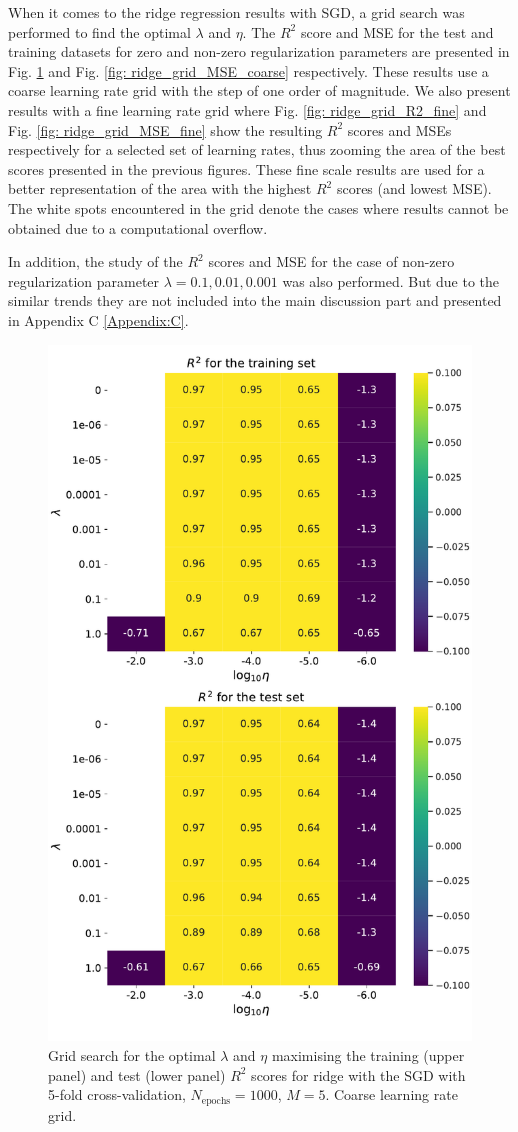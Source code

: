 \documentclass{emulateapj}
\begin{document}
When it comes to the ridge regression results with SGD, a grid search was performed to find the optimal $\lambda$ and $\eta$. The $R^{2}$ score and MSE for the test and training datasets  for zero and non-zero regularization parameters are presented in Fig. \ref{fig: ridge_grid_R2_coarse} and Fig. \ref{fig: ridge_grid_MSE_coarse} respectively. These results use a coarse learning rate grid with the step of one order of magnitude. We also present results with a fine learning rate grid where Fig. \ref{fig: ridge_grid_R2_fine} and Fig. \ref{fig: ridge_grid_MSE_fine} show the resulting $R^{2}$ scores and MSEs respectively for a selected set of learning rates, thus zooming the area of the best scores presented in the previous figures. These fine scale results are used for a better representation of the area with the highest $R^{2}$ scores (and lowest MSE). The white spots encountered in the grid denote the cases where results cannot be obtained due to a computational overflow.

In addition, the study of the $R^2$ scores and MSE for the case of non-zero regularization parameter $\lambda=0.1,0.01,0.001$ was also performed. But due to the similar trends they are not included into the main discussion part and presented in Appendix C \ref{Appendix:C}. 

\begin{figure}[!htb]
    \centering
    \includegraphics[width=.49\textwidth]{Figures/ridge_R2.pdf}
    \caption{Grid search for the optimal $\lambda$ and $\eta$ maximising the training (upper panel) and test (lower panel) $R^2$ scores for ridge with the SGD with 5-fold cross-validation, $N_{\mathrm{epochs}}=1000$, $M=5$. Coarse learning rate grid.}
    \label{fig: ridge_grid_R2_coarse}
\end{figure}
\end{document}
